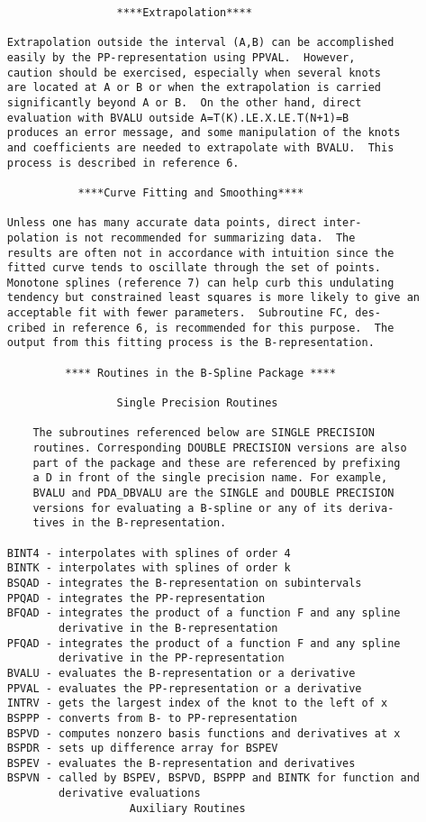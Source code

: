 \begin{verbatim}
                      ****Extrapolation****

     Extrapolation outside the interval (A,B) can be accomplished
     easily by the PP-representation using PPVAL.  However,
     caution should be exercised, especially when several knots
     are located at A or B or when the extrapolation is carried
     significantly beyond A or B.  On the other hand, direct
     evaluation with BVALU outside A=T(K).LE.X.LE.T(N+1)=B
     produces an error message, and some manipulation of the knots
     and coefficients are needed to extrapolate with BVALU.  This
     process is described in reference 6.

                ****Curve Fitting and Smoothing****

     Unless one has many accurate data points, direct inter-
     polation is not recommended for summarizing data.  The
     results are often not in accordance with intuition since the
     fitted curve tends to oscillate through the set of points.
     Monotone splines (reference 7) can help curb this undulating
     tendency but constrained least squares is more likely to give an
     acceptable fit with fewer parameters.  Subroutine FC, des-
     cribed in reference 6, is recommended for this purpose.  The
     output from this fitting process is the B-representation.

              **** Routines in the B-Spline Package ****

                      Single Precision Routines

         The subroutines referenced below are SINGLE PRECISION
         routines. Corresponding DOUBLE PRECISION versions are also
         part of the package and these are referenced by prefixing
         a D in front of the single precision name. For example,
         BVALU and PDA_DBVALU are the SINGLE and DOUBLE PRECISION
         versions for evaluating a B-spline or any of its deriva-
         tives in the B-representation.

     BINT4 - interpolates with splines of order 4
     BINTK - interpolates with splines of order k
     BSQAD - integrates the B-representation on subintervals
     PPQAD - integrates the PP-representation
     BFQAD - integrates the product of a function F and any spline
             derivative in the B-representation
     PFQAD - integrates the product of a function F and any spline
             derivative in the PP-representation
     BVALU - evaluates the B-representation or a derivative
     PPVAL - evaluates the PP-representation or a derivative
     INTRV - gets the largest index of the knot to the left of x
     BSPPP - converts from B- to PP-representation
     BSPVD - computes nonzero basis functions and derivatives at x
     BSPDR - sets up difference array for BSPEV
     BSPEV - evaluates the B-representation and derivatives
     BSPVN - called by BSPEV, BSPVD, BSPPP and BINTK for function and
             derivative evaluations
                        Auxiliary Routines


\end{verbatim}
